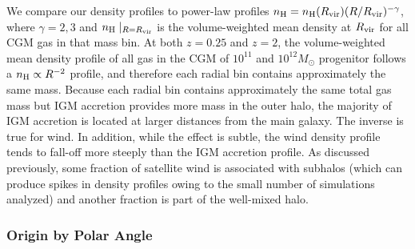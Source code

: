 \documentclass[fleqn,usenatbib]{mnras}
\begin{document}
We compare our density profiles to power-law profiles $n_{\rm H } = n_{\rm H} (R_{\rm vir})  (R/R_{\rm vir})^{-\gamma}$, where $\gamma =2,3$ and $n_{\rm H} \mid_{R=R_{\rm vir}}$ is the volume-weighted mean density at $R_{\rm vir}$ for all CGM gas in that mass bin.
At both $z=0.25$ and $z=2$, the volume-weighted mean density profile of all gas in the CGM of $10^{11}$ and $10^{12} M_\odot$ progenitor  follows a $n_{\rm H} \propto R^{-2}$ profile, and therefore each radial bin contains approximately the same mass.
Because each radial bin contains approximately the same total gas mass but IGM accretion provides more mass in the outer halo, the majority of IGM accretion is located at larger distances from the main galaxy.
The inverse is true for wind. 
In addition, while the effect is subtle, the wind density profile tends to fall-off more steeply than the IGM accretion profile. 
As discussed previously, some fraction of satellite wind is associated with subhalos (which can produce spikes in density profiles owing to the small number of simulations analyzed) and another fraction is part of the well-mixed halo.

\subsubsection{Origin by Polar Angle}
\label{sec:origin_by_angle}
\end{document}

